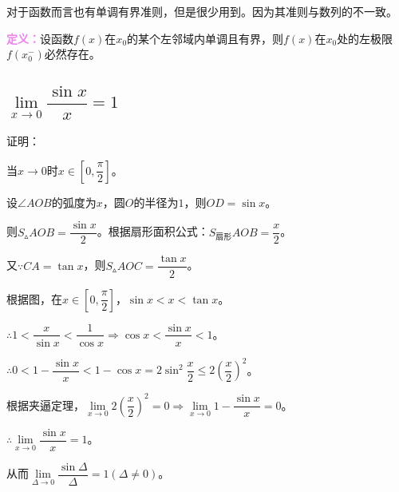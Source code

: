\documentclass[UTF8, 12pt]{ctexart}
\begin{document}
对于函数而言也有单调有界准则，但是很少用到。因为其准则与数列的不一致。

\textcolor{violet}{\textbf{定义：}}设函数$f(x)$在$x_0$的某个左邻域内单调且有界，则$f(x)$在$x_0$处的左极限$f(x_0^-)$必然存在。

\subsection{\texorpdfstring{$\lim\limits_{x\to 0}\dfrac{\sin x}{x}=1$}{}}

证明：

\begin{minipage}{0.7\linewidth}
    当$x\to 0$时$x\in[0,\dfrac{\pi}{2}]$。

    设$\angle AOB$的弧度为$x$，圆$O$的半径为$1$，则$OD=\sin x$。

    则$S_\vartriangle AOB=\dfrac{\sin x}{2}$。根据扇形面积公式：$S_{\text{扇形}}AOB=\dfrac{x}{2}$。

    又$\because CA=\tan x$，则$S_\vartriangle AOC=\dfrac{\tan x}{2}$。
\end{minipage}
\hfill
\begin{minipage}{0.2\linewidth}
\end{minipage}

根据图，在$x\in[0,\dfrac{\pi}{2}]$，$\sin x<x<\tan x$。

$\therefore 1<\dfrac{x}{\sin x}<\dfrac{1}{\cos x}\Rightarrow\cos x<\dfrac{\sin x}{x}<1$。

$\therefore 0<1-\dfrac{\sin x}{x}<1-\cos x=2\sin^2\dfrac{x}{2}\leqslant 2\left(\dfrac{x}{2}\right)^2$。

根据夹逼定理，$\lim\limits_{x\to 0}2\left(\dfrac{x}{2}\right)^2=0\Rightarrow\lim\limits_{x\to 0}1-\dfrac{\sin x}{x}=0$。

$\therefore\lim\limits_{x\to 0}\dfrac{\sin x}{x}=1$。

从而$\lim\limits_{\Delta\to 0}\dfrac{\sin\Delta}{\Delta}=1(\Delta\neq 0)$。
\end{document}
